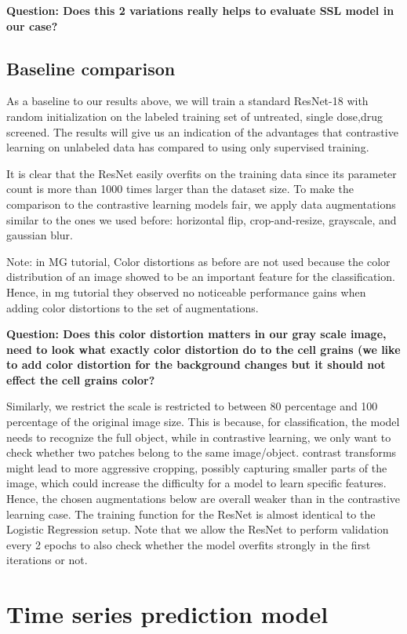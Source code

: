 \documentclass[12pt,twoside,a4paper,parskip]{scrbook} %
\begin{document}
\textbf{Question: Does this 2 variations really helps to evaluate SSL model in our case?} 
\subsection{Baseline comparison}
As a baseline to our results above, we will train a standard ResNet-18 with random initialization on the labeled training set of untreated, single dose,drug screened. The results will give us an indication of the advantages that contrastive learning on unlabeled data has compared to using only supervised training.

It is clear that the ResNet easily overfits on the training data since its parameter count is more than 1000 times larger than the dataset size. To make the comparison to the contrastive learning models fair, we apply data augmentations similar to the ones we used before: horizontal flip, crop-and-resize, grayscale, and gaussian blur. 

Note: in MG tutorial, Color distortions as before are not used because the color distribution of an image showed to be an important feature for the classification. Hence, in mg tutorial they observed no noticeable performance gains when adding color distortions to the set of augmentations.

\textbf{Question: Does this color distortion matters in our gray scale image, need to look what exactly color distortion do to the cell grains (we like to add color distortion for the background changes but it should not effect the cell grains color?} 

Similarly, we restrict  the scale is restricted to between 80 percentage and 100 percentage of the original image size. This is because, for classification, the model needs to recognize the full object, while in contrastive learning, we only want to check whether two patches belong to the same image/object. contrast transforms might lead to more aggressive cropping, possibly capturing smaller parts of the image, which could increase the difficulty for a model to learn specific features. Hence, the chosen augmentations below are overall weaker than in the contrastive learning case.
The training function for the ResNet is almost identical to the Logistic Regression setup. Note that we allow the ResNet to perform validation every 2 epochs to also check whether the model overfits strongly in the first iterations or not.
\section{Time series prediction model}
\end{document}
